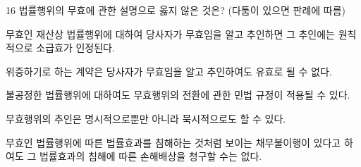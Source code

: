 \begin{question}{16}
법률행위의 무효에 관한 설명으로 옳지 않은 것은? (다툼이 있으면 판례에 따름)
\begin{choices}
  \item 무효인 재산상 법률행위에 대하여 당사자가 무효임을 알고 추인하면 그 추인에는 원칙적으로 소급효가 인정된다.
  \item 위증하기로 하는 계약은 당사자가 무효임을 알고 추인하여도 유효로 될 수 없다.
  \item 불공정한 법률행위에 대하여도 무효행위의 전환에 관한 민법 규정이 적용될 수 있다.
  \item 무효행위의 추인은 명시적으로뿐만 아니라 묵시적으로도 할 수 있다.
  \item 무효인 법률행위에 따른 법률효과를 침해하는 것처럼 보이는 채무불이행이 있다고 하여도 그 법률효과의 침해에 따른 손해배상을 청구할 수는 없다.
\end{choices}
\end{question}

